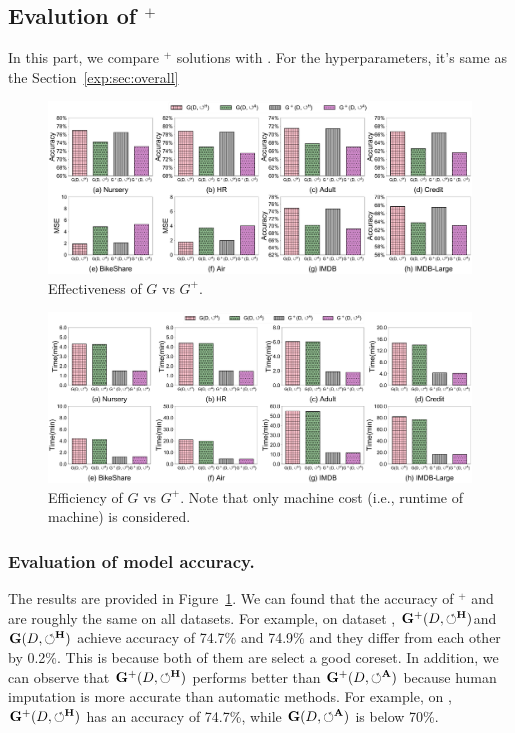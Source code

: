 \subsection{Evalution of \ours$^+$}
\label{exp:sec:G+}

In this part, we compare \ours$^+$ solutions with \ours. For the hyperparameters, it's same as the Section~\ref{exp:sec:overall}

\begin{figure}
	\centering
	\includegraphics[width=\textwidth]{figs/effectiveness_new}
	\caption{Effectiveness of $G$ vs $G^+$.}
	\label{fig:effectiveness_new}
\end{figure}

\begin{figure}
	\centering
	\includegraphics[width=\textwidth]{figs/efficiency_new}
	\caption{Efficiency of $G$ vs $G^+$. Note that only machine cost (i.e., runtime of machine) is considered.}
	\label{fig:efficiency_new}
\end{figure}


\subsubsection{Evaluation of model accuracy.}
The results are provided in Figure~\ref{fig:effectiveness_new}. We can found that the accuracy of \ours$^+$ and \ours are roughly the same on all datasets. For example, on dataset \imdbl,  $\mathbf{G}^+(D,\circlearrowleft^\mathbf{H})$and $\mathbf{G}(D,\circlearrowleft^\mathbf{H})$ achieve accuracy of 74.7\% and 74.9\% and they differ from each other by 0.2\%. This is because both of them are  select a good coreset. In addition, we can observe that $\mathbf{G}^+(D,\circlearrowleft^\mathbf{H})$ performs better than $\mathbf{G}^+(D,\circlearrowleft^\mathbf{A})$ because human imputation is more accurate than automatic methods. For example, on \imdbl,  $\mathbf{G}^+(D,\circlearrowleft^\mathbf{H})$ has an accuracy of 74.7\%, while $\mathbf{G}(D,\circlearrowleft^\mathbf{A})$ is below 70\%.

